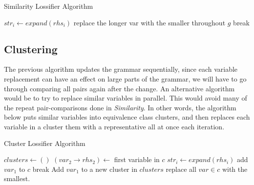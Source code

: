 \documentclass[11pt]{article}
\begin{document}
\begin{algorithm}[h]
\caption{Similarity Lossifier Algorithm}
\label{sim_alg}
\begin{algorithmic}[1]
 
      \State $str_{i} \gets expand(rhs_i)$
        \State replace the longer var with the smaller throughout $g$
        \State break
      \EndIf
    \EndFor
  \EndWhile
\EndProcedure
\end{algorithmic}
\end{algorithm}

\subsection{Clustering}

The previous algorithm updates the grammar sequentially, since each
variable replacement can have an effect on large parts of the grammar,
we will have to go through comparing all pairs again after the change.
An alternative algorithm would be to try to replace similar variables in
parallel. This would avoid many of the repeat pair-comparisons done in
\emph{Similarity}. In other words, the algorithm below puts 
similar variables
into equivalence class clusters, and then replaces each variable
in a cluster them with a representative
all at once each iteration.

\begin{algorithm}[h]
\caption{Cluster Lossifier Algorithm}
\label{cluster_alg}
\begin{algorithmic}[1]
 
    \State $clusters \gets ()$
        \State $(var_2 \rightarrow rhs_2) \gets $ first variable in $c$
        \State $str_{i} \gets expand(rhs_i)$
          \State add $var_1$ to $c$
          \State break
        \EndIf
      \EndFor
        \State Add $var_1$ to a new cluster in $clusters$
      \EndIf
    \EndFor
      \State replace all $var \in c$ with the smallest.
    \EndFor
  \EndWhile
\EndProcedure
\end{algorithmic}
\end{algorithm}
\end{document}
